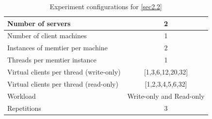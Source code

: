 \documentclass[11pt,a4paper]{article}
\begin{document}
\begin{table}[H]
    \centering
	\begin{tabular}{|l|c|}
		\hline Number of servers                        & 2                        \\ 
		\hline Number of client machines                & 1                        \\ 
		\hline Instances of memtier per machine         & 2                        \\ 
		\hline Threads per memtier instance             & 1                        \\
		\hline Virtual clients per thread (write-only)  & [1,3,6,12,20,32]         \\ 
		\hline Virtual clients per thread (read-only)   & [1,2,3,4,5,6,32]         \\ 
		\hline Workload                                 & Write-only and Read-only \\
		\hline Repetitions                              & 
		3                        \\ 
		\hline 
	\end{tabular}
	\caption{Experiment configurations for \autoref{sec2.2}} \label{exp2-2}
\end{table}
\end{document}
